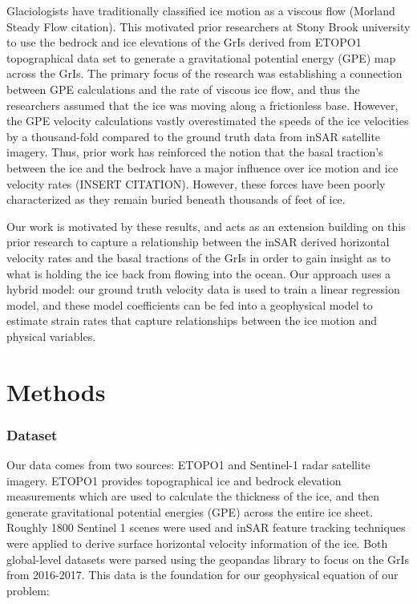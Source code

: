 \documentclass{article}
\begin{document}
Glaciologists have traditionally classified ice motion as a viscous flow (Morland Steady Flow citation). This motivated prior researchers at Stony Brook university to use the bedrock and ice elevations of the GrIs derived from ETOPO1 topographical data set to generate a gravitational potential energy (GPE) map across the GrIs. The primary focus of the research was establishing a connection between GPE calculations and the rate of viscous ice flow, and thus the researchers assumed that the ice was moving along a frictionless base. However, the GPE velocity calculations vastly overestimated the speeds of the ice velocities by a thousand-fold compared to the ground truth data from inSAR satellite imagery. Thus, prior work has reinforced the notion that the basal traction's between the ice and the bedrock have a major influence over ice motion and ice velocity rates (INSERT CITATION). However, these forces have been poorly characterized as they remain buried beneath thousands of feet of ice.

Our work is motivated by these results, and acts as an extension building on this prior research to capture a relationship between the inSAR derived horizontal velocity rates and the basal tractions of the GrIs in order to gain insight as to what is holding the ice back from flowing into the ocean. Our approach uses a hybrid model: our ground truth velocity data is used to train a linear regression model, and these model coefficients can be fed into a geophysical model to estimate strain rates that capture relationships between the ice motion and physical variables.

\section{Methods}

\subsubsection{Dataset}
Our data comes from two sources: ETOPO1 and Sentinel-1 radar satellite imagery. ETOPO1 provides topographical ice and bedrock elevation measurements which are used to calculate the thickness of the ice, and then generate gravitational potential energies (GPE) across the entire ice sheet. Roughly 1800 Sentinel 1 scenes were used and inSAR feature tracking techniques were applied to derive surface horizontal velocity information of the ice. Both global-level datasets were parsed using the geopandas library to focus on the GrIs from 2016-2017. This data is the foundation for our geophysical equation of our problem:
\end{document}
